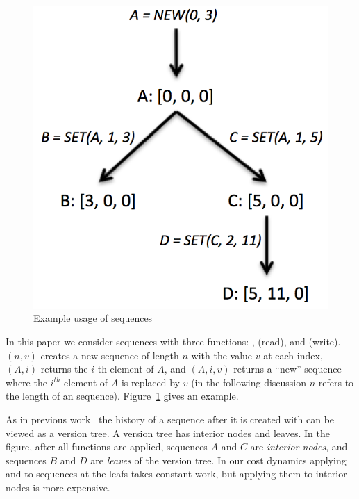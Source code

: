 \begin{figure}[!ht]
\centering 
\includegraphics[scale=0.45]{leaf_interior_intro}
\nocaptionrule \caption{Example usage of sequences}
\label{fig:leaf_interior_intro}
\end{figure}

In this paper we consider sequences with three functions: \new{},
\get{} (read), and \set{} (write). \new{}$(n,v)$
creates a new sequence of length $n$ with the value $v$ at each index, \get$(A,i)$ returns the $i$-th element of $A$, and
\set$(A,i,v)$ returns a ``new'' sequence where the $i^{th}$ element of $A$ is replaced by $v$ (in the following discussion $n$ refers to the length of
an sequence).  Figure~\ref{fig:leaf_interior_intro} gives an example.  

As in previous work~\cite{AHN88} the history of a sequence after it is
created with \new{} can be viewed as a version tree.  A version
tree has interior nodes and leaves.  In the figure, after all
functions are applied, sequences $A$ and $C$ are \emph{interior nodes},
and sequences $B$ and $D$ are \emph{leaves} of the version tree.  In our
cost dynamics applying \get{} and \set{} to sequences at the leafs takes
constant work, but applying them to interior nodes is more expensive.


